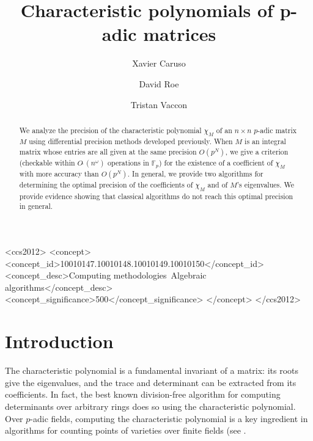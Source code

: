 \documentclass[sigconf]{acmart}
\newcommand{\Fp}{\mathbb{F}_p}
\newcommand{\softO}{O\tilde{~}}
\theoremstyle{definition}
\begin{document}
\title{Characteristic polynomials of p-adic matrices}

\author{Xavier Caruso}
\author{David Roe}
\author{Tristan Vaccon}


\begin{CCSXML}
<ccs2012>
<concept>
<concept_id>10010147.10010148.10010149.10010150</concept_id>
<concept_desc>Computing methodologies~Algebraic algorithms</concept_desc>
<concept_significance>500</concept_significance>
</concept>
</ccs2012>
\end{CCSXML}



\begin{abstract}
We analyze the precision of the characteristic polynomial $\chi_M$ of 
an $n \times n$ $p$-adic matrix $M$ using differential precision methods 
developed previously.  When $M$ is an integral matrix whose entries are 
all given at the same precision $O(p^N)$, we give a criterion (checkable 
within $\softO(n^\omega)$ operations in $\Fp$) for the existence of a
coefficient of $\chi_M$ with more accuracy than $O(p^N)$.
In general, we provide two algorithms for determining the optimal 
precision of the coefficients of $\chi_M$ and of $M$'s eigenvalues.
We provide evidence showing that classical algorithms do not reach
this optimal precision in general.
\end{abstract}

\maketitle

\section{Introduction}

The characteristic polynomial is a fundamental invariant of a matrix: its roots
give the eigenvalues, and the trace and determinant can be extracted from its coefficients.
In fact, the best known division-free algorithm for computing determinants
over arbitrary rings \cite{kaltofen-villard:04a} does so using the characteristic polynomial.
Over $p$-adic fields, computing the characteristic polynomial is a key ingredient in
algorithms for counting points of varieties over finite fields (see
\cite{kedlaya:01a, harvey:07a, harvey:14a}.
\end{document}
